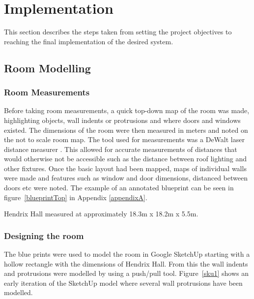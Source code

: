 \documentclass[../../main.tex]{subfiles}
\begin{document}
\section{Implementation}
	This section describes the steps taken from setting the project objectives to reaching the final implementation of the desired system.


	\subsection{Room Modelling}

		\subsubsection{Room Measurements}

			Before taking room measurements, a quick top-down map of the room was made, highlighting objects, wall indents or protrusions and where doors and windows existed. The dimensions of the room were then measured in meters and noted on the not to scale room map. The tool used for measurements was a DeWalt laser distance measurer \cite{dewalt}. This allowed for accurate measurements of distances that would otherwise not be accessible such as the distance between roof lighting and other fixtures. Once the basic layout had been mapped, maps of individual walls were made and features such as window and door dimensions, distanced between doors etc were noted. The example of an annotated blueprint can be seen in figure~\ref{blueprintTop} in Appendix \ref{appendixA}.

			Hendrix Hall measured at approximately 18.3m x 18.2m x 5.5m.

		\subsubsection{Designing the room}
			\label{designRoom}
			The blue prints were used to model the room in Google SketchUp starting with a hollow rectangle with the dimensions of Hendrix Hall. From this the wall indents and protrusions were modelled by using a push/pull tool. Figure~\ref{sku1} shows an early iteration of the SketchUp model where several wall protrusions have been modelled.
\end{document}
